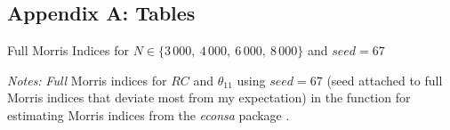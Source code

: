 


\subsection*{Appendix A: Tables} \label{appendix_a}
\appendix

\begin{table}[H]
    \centering
    \caption{Full Morris Indices for $N \in \{3\,000,\ 4\,000,\ 6\,000,\ 8\,000\}$ and $seed=67$}
    \label{appendix_morris_seed_67}
    \begin{threeparttable}
    \begin{centering}
        
        \begin{tablenotes}
            \small
            \item \textit{Notes:} \textit{Full} Morris indices for $RC$ and $\theta_{11}$ using $seed=67$ (seed attached to full Morris indices that deviate most from my expectation) in the function for estimating Morris indices from the \textit{econsa} package \citep{OSE21}.
        \end{tablenotes}
    \end{centering}

    \end{threeparttable}

\end{table}